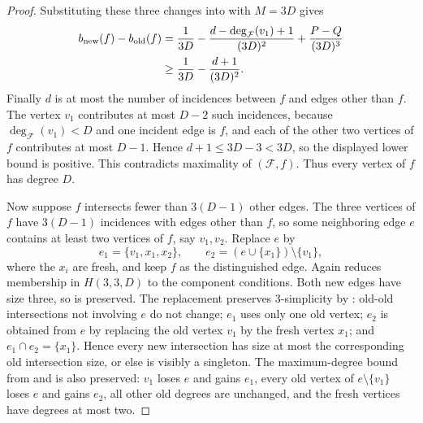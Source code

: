 \begin{proof}
Substituting these three changes into  with
$M=3D$ gives
\[
\begin{aligned}
b_{\rm new}(f)-b_{\rm old}(f)
&=\frac1{3D}
-\frac{d-\deg_{\mathcal F}(v_1)+1}{(3D)^2}
+\frac{P-Q}{(3D)^3}  \\
&\ge \frac1{3D}-\frac{d+1}{(3D)^2}.
\end{aligned}
\]
Finally $d$ is at most the number of incidences between $f$ and edges other
than $f$.  The vertex $v_1$ contributes at most $D-2$ such incidences, because
$\deg_{\mathcal F}(v_1)<D$ and one incident edge is $f$, and each of the other
two vertices of $f$ contributes at most $D-1$.  Hence $d+1\le 3D-3<3D$, so
the displayed lower bound is positive.  This contradicts maximality of
$(\mathcal F,f)$.  Thus every vertex of $f$ has degree $D$.

Now suppose $f$ intersects fewer than $3(D-1)$ other edges.  The three
vertices of $f$ have $3(D-1)$ incidences with edges other than $f$, so some
neighboring edge $e$ contains at least two vertices of $f$, say $v_1,v_2$.
Replace $e$ by
\[
e_1=\{v_1,x_1,x_2\},\qquad
e_2=(e\cup\{x_1\})\setminus\{v_1\},
\]
where the $x_i$ are fresh, and keep $f$ as the distinguished edge.  Again
 reduces membership in $H(3,3,D)$ to the component
conditions.  Both new edges have size three, so 
is preserved.  The replacement preserves $3$-simplicity by
: old-old intersections not involving $e$ do not
change; $e_1$ uses only one old vertex; $e_2$ is obtained from $e$ by replacing
the old vertex $v_1$ by the fresh vertex $x_1$; and
$e_1\cap e_2=\{x_1\}$.  Hence every new intersection has size at most the
corresponding old intersection size, or else is visibly a singleton.  The
maximum-degree bound from  and
 is also preserved: $v_1$ loses $e$ and gains
$e_1$, every old vertex of $e\setminus\{v_1\}$ loses $e$ and gains $e_2$,
all other old degrees are unchanged, and the fresh vertices have degrees at
most two.


\end{proof}
